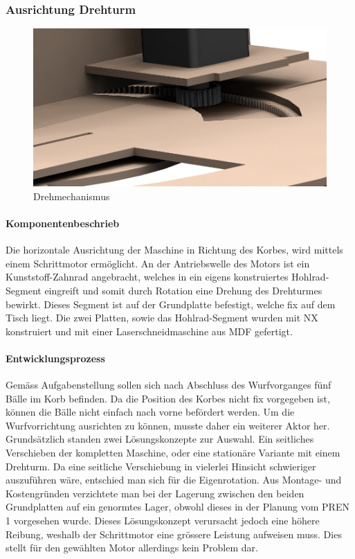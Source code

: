 \subsubsection{Ausrichtung Drehturm}
\begin{figure}[h!]
	\centering
	\includegraphics[width=\linewidth]{../../fig/Drehmechanismus}
	\caption{Drehmechanismus}
	\label{fig:Drehmechanismus}
\end{figure}
\paragraph{Komponentenbeschrieb}
Die horizontale Ausrichtung der Maschine in Richtung des Korbes, wird mittels einem Schrittmotor ermöglicht. An der Antriebswelle des Motors ist ein Kunststoff-Zahnrad angebracht, welches in ein eigens konstruiertes Hohlrad-Segment eingreift und somit durch Rotation eine Drehung des Drehturmes bewirkt. Dieses Segment ist auf der Grundplatte befestigt, welche fix auf dem Tisch liegt. Die zwei Platten, sowie das Hohlrad-Segment wurden mit NX konstruiert und mit einer Laserschneidmaschine aus MDF gefertigt.

\paragraph{Entwicklungsprozess}
Gemäss Aufgabenstellung sollen sich nach Abschluss des Wurfvorganges fünf Bälle im Korb befinden. Da die Position des Korbes nicht fix vorgegeben ist, können die Bälle nicht einfach nach vorne befördert werden. Um die Wurfvorrichtung ausrichten zu können, musste daher ein weiterer Aktor her. Grundsätzlich standen zwei Lösungskonzepte zur Auswahl. Ein seitliches Verschieben der kompletten Maschine, oder eine stationäre Variante mit einem Drehturm. Da eine seitliche Verschiebung in vielerlei Hinsicht schwieriger auszuführen wäre, entschied man sich für die Eigenrotation. Aus Montage- und Kostengründen verzichtete man bei der Lagerung zwischen den beiden Grundplatten auf ein genormtes Lager, obwohl dieses in der Planung vom PREN 1 vorgesehen wurde. Dieses Lösungskonzept verursacht jedoch eine höhere Reibung, weshalb der Schrittmotor eine grössere Leistung aufweisen muss. Dies stellt für den gewählten Motor allerdings kein Problem dar.